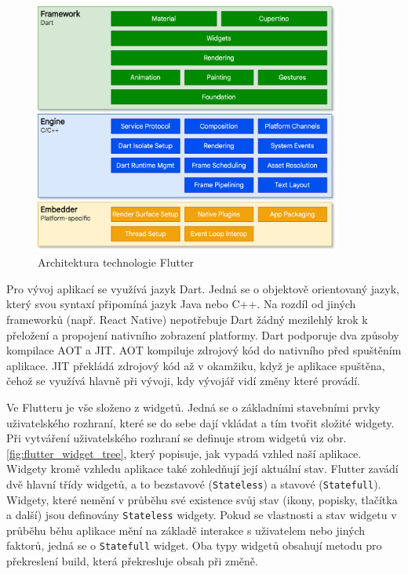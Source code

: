 \documentclass[czech, bc, kiv, he, iso690numb]{fasthesis}
\begin{document}
\begin{figure}[h!]
  \centering
  \includegraphics[width=0.9\textwidth]{img/BP-Runt/Technologies/flutter_archdiagram.png}
  \caption{Architektura technologie Flutter \cite{Flutter}} %
  \label{fig:flutter_architecture}
\end{figure}

Pro vývoj aplikací se využívá jazyk Dart. Jedná se o objektově orientovaný jazyk, který svou syntaxí připomíná jazyk Java nebo C++. Na rozdíl od jiných frameworků (např. React Native) nepotřebuje Dart žádný mezilehlý krok k přeložení a propojení nativního zobrazení platformy. Dart podporuje dva způsoby kompilace \gls{AOT} a \gls{JIT}. \gls{AOT} kompiluje zdrojový kód do nativního před spuštěním aplikace. \gls{JIT} překládá zdrojový kód až v okamžiku, když je aplikace spuštěna, čehož se využívá hlavně při vývoji, kdy vývojář vidí změny které provádí. \cite{Bartosińska_Dembny_2024} \cite{AltexSoft_2022}

Ve Flutteru je vše složeno z widgetů. Jedná se o základními stavebními prvky uživatelského rozhraní, které se do sebe dají vkládat a tím tvořit složité widgety. Při vytváření uživatelského rozhraní se definuje strom widgetů viz obr. \ref{fig:flutter_widget_tree}, který popisuje, jak vypadá vzhled naší aplikace. Widgety kromě vzhledu aplikace také zohledňují její aktuální stav. Flutter zavádí dvě hlavní třídy widgetů, a to bezstavové (\texttt{Stateless}) a stavové (\texttt{Statefull}). Widgety, které nemění v průběhu své existence svůj stav (ikony, popisky, tlačítka a další) jsou definovány \texttt{Stateless} widgety. Pokud se vlastnosti a stav widgetu v průběhu běhu aplikace mění na základě interakce s uživatelem nebo jiných faktorů, jedná se o \texttt{Statefull} widget. Oba typy widgetů obsahují metodu pro překreslení build, která překresluje obsah při změně.
\end{document}
